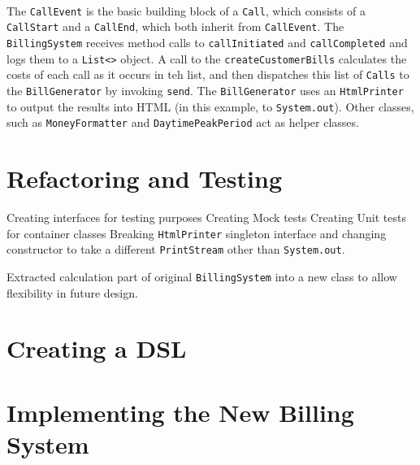 \documentclass[a4paper,12pt,oneside,final]{article}
\begin{document}
\paragraph{}
The \verb+CallEvent+ is the basic building block of a \verb+Call+, which consists of a \verb+CallStart+ and a \verb+CallEnd+, which both inherit from \verb+CallEvent+.  The \verb+BillingSystem+ receives method calls to \verb+callInitiated+ and \verb+callCompleted+ and logs them to a \verb+List<>+ object.  A call to the \verb+createCustomerBills+ calculates the costs of each call as it occurs in teh list, and then dispatches this list of \verb+Calls+ to the \verb+BillGenerator+ by invoking \verb+send+.  The \verb+BillGenerator+ uses an \verb+HtmlPrinter+ to output the results into HTML (in this example, to \verb+System.out+).  Other classes, such as \verb+MoneyFormatter+ and \verb+DaytimePeakPeriod+ act as helper classes.

\section{Refactoring and Testing} %
Creating interfaces for testing purposes
Creating Mock tests
Creating Unit tests for container classes
Breaking \verb+HtmlPrinter+ singleton interface and changing constructor to take a different \verb+PrintStream+ other than \verb+System.out+.

Extracted calculation part of original \verb+BillingSystem+ into a new class to allow flexibility in future design.

\section{Creating a DSL} %

\section{Implementing the New Billing System}  %
\end{document}
